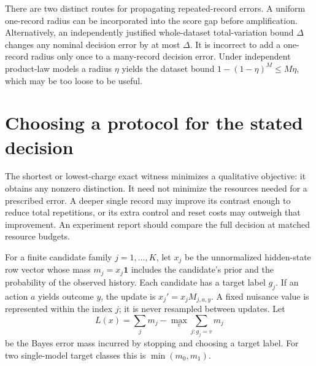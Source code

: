 There are two distinct routes for propagating repeated-record errors. A uniform
one-record radius can be incorporated into the score gap before amplification.
Alternatively, an independently justified whole-dataset total-variation bound
$\Delta$ changes any nominal decision error by at most $\Delta$.
It is incorrect to add a one-record radius only once to a many-record decision
error. Under independent product-law models a radius $\eta$ yields the dataset
bound $1-(1-\eta)^M\leq M\eta$, which may be too loose to be useful.

\section{Choosing a protocol for the stated decision}

The shortest or lowest-charge exact witness minimizes a qualitative objective:
it obtains any nonzero distinction. It need not minimize the resources needed
for a prescribed error. A deeper single record may improve its contrast enough
to reduce total repetitions, or its extra control and reset costs may outweigh
that improvement. An experiment report should compare the full decision at
matched resource budgets.

For a finite candidate family $j=1,\ldots,K$, let $x_j$ be the unnormalized
hidden-state row vector whose mass $m_j=x_j\mathbf1$ includes the candidate's
prior and the probability of the observed history. Each candidate has a target
label $g_j$. If an action $a$ yields outcome $y$, the update is
$x_j'=x_jM_{j,a,y}$. A fixed nuisance value is represented within the index $j$;
it is never resampled between updates. Let
\[
 L(x)=\sum_jm_j-\max_v\sum_{j:g_j=v}m_j
\]
be the Bayes error mass incurred by stopping and choosing a target label. For
two single-model target classes this is $\min(m_0,m_1)$.

